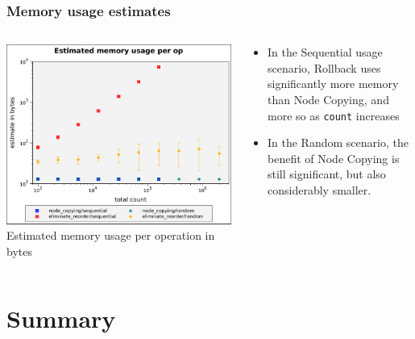 \documentclass[compress]{beamer}
\begin{document}
\begin{frame}
\frametitle{Memory usage estimates}
\begin{columns}[t]
  \begin{column}{0.55\textwidth}

    \includegraphics[height=0.65\textheight]{figures/graphs/space-results-per-op.pdf}
    \newline Estimated memory usage per operation in bytes
  \end{column}

  \begin{column}{0.50\textwidth}

    \begin{itemize}

      \item In the Sequential usage scenario, Rollback uses significantly more
      memory than Node Copying, and more so as \texttt{count} increases

      \item In the Random scenario, the benefit of Node Copying is still
      significant, but also considerably smaller.

    \end{itemize}

  \end{column}
\end{columns}
\end{frame}

\section*{Summary}
\end{document}
